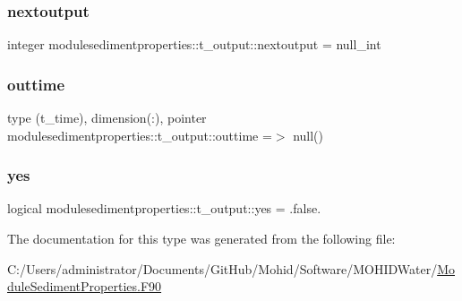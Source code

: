 \subsubsection{\texorpdfstring{nextoutput}{nextoutput}}
{\footnotesize\ttfamily integer modulesedimentproperties\+::t\+\_\+output\+::nextoutput = null\+\_\+int\hspace{0.3cm}{\ttfamily [private]}}

\mbox{\label{structmodulesedimentproperties_1_1t__output_afa2919505bebc1aaf247332d86a196b7}} 
\subsubsection{\texorpdfstring{outtime}{outtime}}
{\footnotesize\ttfamily type (t\+\_\+time), dimension(\+:), pointer modulesedimentproperties\+::t\+\_\+output\+::outtime =$>$ null()\hspace{0.3cm}{\ttfamily [private]}}

\mbox{\label{structmodulesedimentproperties_1_1t__output_a43181389dc0e9cde686799cb9f9ac136}} 
\subsubsection{\texorpdfstring{yes}{yes}}
{\footnotesize\ttfamily logical modulesedimentproperties\+::t\+\_\+output\+::yes = .false.\hspace{0.3cm}{\ttfamily [private]}}



The documentation for this type was generated from the following file\+:\begin{DoxyCompactItemize}
\item 
C\+:/\+Users/administrator/\+Documents/\+Git\+Hub/\+Mohid/\+Software/\+M\+O\+H\+I\+D\+Water/\mbox{\hyperlink{_module_sediment_properties_8_f90}{Module\+Sediment\+Properties.\+F90}}\end{DoxyCompactItemize}
